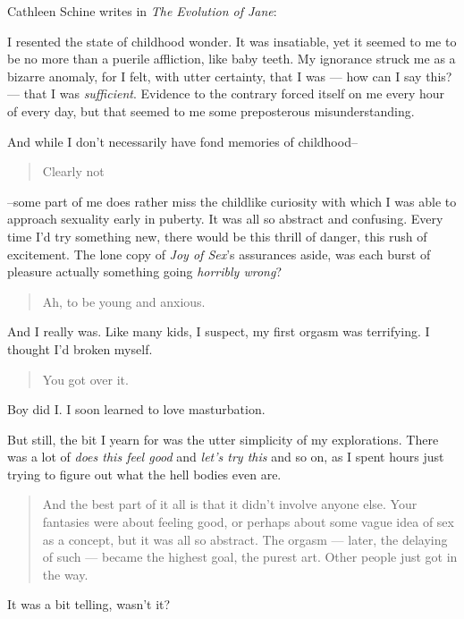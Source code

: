 Cathleen Schine writes in \emph{The Evolution of Jane}:

I resented the state of childhood wonder. It was insatiable, yet it seemed to me to be no more than a puerile affliction, like baby teeth. My ignorance struck me as a bizarre anomaly, for I felt, with utter certainty, that I was --- how can I say this? --- that I was \emph{sufficient}. Evidence to the contrary forced itself on me every hour of every day, but that seemed to me some preposterous misunderstanding.

And while I don't necessarily have fond memories of childhood--

\begin{quote}
Clearly not
\end{quote}

--some part of me does rather miss the childlike curiosity with which I was able to approach sexuality early in puberty. It was all so abstract and confusing. Every time I'd try something new, there would be this thrill of danger, this rush of excitement. The lone copy of \emph{Joy of Sex}'s assurances aside, was each burst of pleasure actually something going \emph{horribly wrong}?

\begin{quote}
Ah, to be young and anxious.
\end{quote}

And I really was. Like many kids, I suspect, my first orgasm was terrifying. I thought I'd broken myself.

\begin{quote}
You got over it.
\end{quote}

Boy did I. I soon learned to love masturbation.

But still, the bit I yearn for was the utter simplicity of my explorations. There was a lot of \emph{does this feel good} and \emph{let's try this} and so on, as I spent hours just trying to figure out what the hell bodies even are.

\begin{quote}
And the best part of it all is that it didn't involve anyone else. Your fantasies were about feeling good, or perhaps about some vague idea of sex as a concept, but it was all so abstract. The orgasm --- later, the delaying of such --- became the highest goal, the purest art. Other people just got in the way.
\end{quote}

It was a bit telling, wasn't it?
